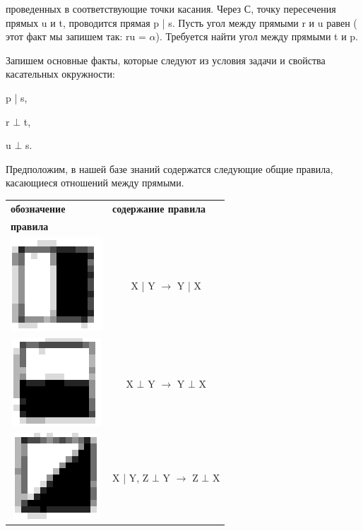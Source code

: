 \begin{minipage}{0.3\textwidth}

проведенных в соответствующие точки
касания. Через С, точку пересечения прямых u и t, проводится прямая p | s. Пусть
угол между прямыми r и u равен  ( этот
факт мы запишем так: ru = $\alpha$). Требуется
найти угол между прямыми t и p.
    
    
\hspace{0.1cm} Запишем основные факты, которые
следуют из условия задачи и свойства
касательных окружности:
\begin{center}
p | s,
        
r $\bot$ t,
        
u $\bot$ s.
\end{center}
\hspace{0.1cm} Предположим, в нашей базе знаний
содержатся следующие общие правила, 
касающиеся отношений между прямыми.
\begin{flushleft}
\begin{tabular}{c c} 
\multicolumn{1}{l}{
\textbf{
обозначение
}}
&
\multicolumn{1}{l}{
\textbf{
содержание правила
}}
\\  
\multicolumn{1}{l}{
\textbf{
правила
}
}
&
\\  

\includegraphics[scale=0.16]{images/cube.png}
& X | Y $\rightarrow$ Y | X  \\ 

\includegraphics[scale=0.16]{images/cube2.png}
& X $\bot$ Y $\rightarrow$ Y $\bot$ X \\

\includegraphics[scale=0.16]{images/cube3.png}
& X | Y, Z $\bot$ Y $\rightarrow$ Z $\bot$ X \\


\end{tabular}
\end{flushleft}
\end{minipage}
